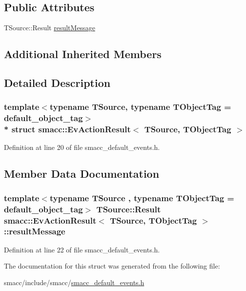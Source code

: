 \subsection*{Public Attributes}
\begin{DoxyCompactItemize}
\item 
T\+Source\+::\+Result \hyperlink{structsmacc_1_1EvActionResult_a3ebe600713e0ddf9b76f34c725c2aeb2}{result\+Message}
\end{DoxyCompactItemize}
\subsection*{Additional Inherited Members}


\subsection{Detailed Description}
\subsubsection*{template$<$typename T\+Source, typename T\+Object\+Tag = default\+\_\+object\+\_\+tag$>$\\*
struct smacc\+::\+Ev\+Action\+Result$<$ T\+Source, T\+Object\+Tag $>$}



Definition at line 20 of file smacc\+\_\+default\+\_\+events.\+h.



\subsection{Member Data Documentation}
\subsubsection[{\texorpdfstring{result\+Message}{resultMessage}}]{\setlength{\rightskip}{0pt plus 5cm}template$<$typename T\+Source , typename T\+Object\+Tag  = default\+\_\+object\+\_\+tag$>$ T\+Source\+::\+Result {\bf smacc\+::\+Ev\+Action\+Result}$<$ T\+Source, T\+Object\+Tag $>$\+::result\+Message}\hypertarget{structsmacc_1_1EvActionResult_a3ebe600713e0ddf9b76f34c725c2aeb2}{}\label{structsmacc_1_1EvActionResult_a3ebe600713e0ddf9b76f34c725c2aeb2}


Definition at line 22 of file smacc\+\_\+default\+\_\+events.\+h.



The documentation for this struct was generated from the following file\+:\begin{DoxyCompactItemize}
\item 
smacc/include/smacc/\hyperlink{smacc__default__events_8h}{smacc\+\_\+default\+\_\+events.\+h}\end{DoxyCompactItemize}
